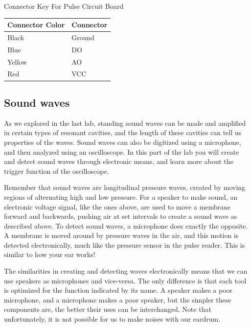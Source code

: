 \begin{center}
Connector Key For Pulse Circuit Board\\
\begin{tabular}{ |l | l | } \hline
  \textbf{Connector Color} & \textbf{Connector} \\ \hline
  Black & Ground \\ \hline
  Blue & DO \\ \hline
  Yellow & AO \\ \hline
  Red & VCC \\ \hline
\end{tabular}
\end{center}

\subsection{Sound waves}

As we explored in the last lab, standing sound waves can be made and amplified in certain types of resonant cavities, and the length of these cavities can tell us properties of the waves. Sound waves can also be digitized using a microphone, and then analyzed using an oscilloscope. In this part of the lab you will create and detect sound waves through electronic means, and learn more about the trigger function of the oscilloscope.

Remember that sound waves are longitudinal pressure waves, created by moving regions of alternating high and low pressure. For a speaker to make sound, an electronic voltage signal, like the ones above, are used to move a membrane forward and backwards, pushing air at set intervals to create a sound wave as described above. To detect sound waves, a microphone does exactly the opposite. A membrane is moved around by pressure waves in the air, and this motion is detected electronically, much like the pressure sensor in the pulse reader. This is similar to how your ear works!

The similarities in creating and detecting waves electronically means that we can use speakers as microphones and vice-versa. The only difference is that each tool is optimized for the function indicated by its name. A speaker makes a poor microphone, and a microphone makes a poor speaker, but the simpler these components are, the better their uses can be interchanged. Note that unfortunately, it is not possible for us to make noises with our eardrum.

